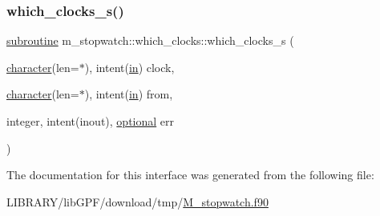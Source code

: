 \mbox{\label{interfacem__stopwatch_1_1which__clocks_a2192ebab810d02eb9fdafb5aaa027b9f}} 
\subsubsection{\texorpdfstring{which\+\_\+clocks\+\_\+s()}{which\_clocks\_s()}}
{\footnotesize\ttfamily \hyperlink{M__stopwatch_83_8txt_acfbcff50169d691ff02d4a123ed70482}{subroutine} m\+\_\+stopwatch\+::which\+\_\+clocks\+::which\+\_\+clocks\+\_\+s (\begin{DoxyParamCaption}\item[{\hyperlink{option__stopwatch_83_8txt_abd4b21fbbd175834027b5224bfe97e66}{character}(len=$\ast$), intent(\hyperlink{M__journal_83_8txt_afce72651d1eed785a2132bee863b2f38}{in})}]{clock,  }\item[{\hyperlink{option__stopwatch_83_8txt_abd4b21fbbd175834027b5224bfe97e66}{character}(len=$\ast$), intent(\hyperlink{M__journal_83_8txt_afce72651d1eed785a2132bee863b2f38}{in})}]{from,  }\item[{integer, intent(inout), \hyperlink{option__stopwatch_83_8txt_aa4ece75e7acf58a4843f70fe18c3ade5}{optional}}]{err }\end{DoxyParamCaption})\hspace{0.3cm}{\ttfamily [private]}}



The documentation for this interface was generated from the following file\+:\begin{DoxyCompactItemize}
\item 
L\+I\+B\+R\+A\+R\+Y/lib\+G\+P\+F/download/tmp/\hyperlink{M__stopwatch_8f90}{M\+\_\+stopwatch.\+f90}\end{DoxyCompactItemize}
